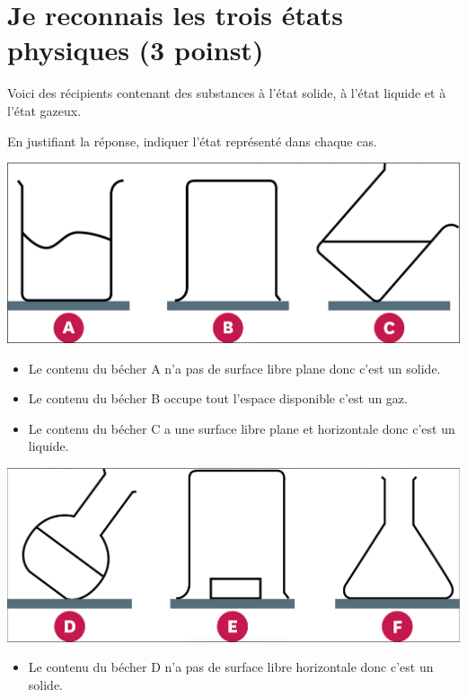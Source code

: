 \section{Je reconnais les trois états physiques (3 poinst)}

Voici des récipients contenant des substances à l'état solide, à l'état liquide et à l'état gazeux.

\begin{questions}
	\question[3] En justifiant la réponse, indiquer l'état représenté dans chaque cas.
		
		\begin{center}
			\includegraphics[scale=0.4]{img/reco1}
		\end{center}
	
	\begin{solution}
		\begin{itemize}
			\item Le contenu du bécher A n'a pas de surface libre plane donc c'est un solide.
			
			\item Le contenu du bécher B occupe tout l'espace disponible c'est un gaz.
			
			\item Le contenu du bécher C a une surface libre plane et horizontale donc c'est un liquide.
		\end{itemize}
	\end{solution}


		\begin{center}
			\includegraphics[scale=0.4]{img/reco2}
		\end{center}
		\begin{solution}
			\begin{itemize}
				\item Le contenu du bécher D n'a pas de surface libre horizontale donc c'est un solide.
				

\end{itemize}
\end{solution}
\end{questions}
